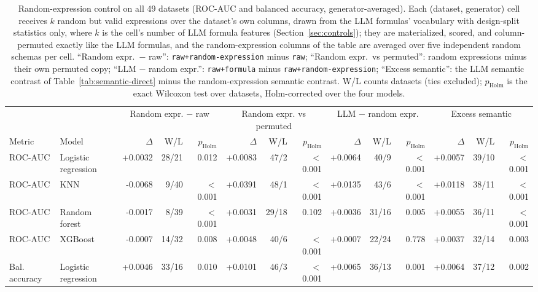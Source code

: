\begin{table}[tbp]
\caption{Random-expression control on all 49 datasets (ROC-AUC and balanced accuracy, generator-averaged). Each (dataset, generator) cell receives $k$ random but valid expressions over the dataset's own columns, drawn from the LLM formulas' vocabulary with design-split statistics only, where $k$ is the cell's number of LLM formula features (Section~\ref{sec:controls}); they are materialized, scored, and column-permuted exactly like the LLM formulas, and the random-expression columns of the table are averaged over five independent random schemas per cell. ``Random expr.\ $-$ raw'': \texttt{raw+random-expression} minus \texttt{raw}; ``Random expr.\ vs permuted'': random expressions minus their own permuted copy; ``LLM $-$ random expr.'': \texttt{raw+formula} minus \texttt{raw+random-expression}; ``Excess semantic'': the LLM semantic contrast of Table~\ref{tab:semantic-direct} minus the random-expression semantic contrast. W/L counts datasets (ties excluded); $p_{\mathrm{Holm}}$ is the exact Wilcoxon test over datasets, Holm-corrected over the four models.}\label{tab:random-expression}
\centering
\small
\begin{adjustbox}{max width=\linewidth}
\begin{tabular}{llrrrrrrrrrrrr}
\toprule
& & \multicolumn{3}{c}{Random expr. $-$ raw} & \multicolumn{3}{c}{Random expr. vs permuted} & \multicolumn{3}{c}{LLM $-$ random expr.} & \multicolumn{3}{c}{Excess semantic} \\
\cmidrule(lr){3-5}\cmidrule(lr){6-8}\cmidrule(lr){9-11}\cmidrule(lr){12-14}
Metric & Model & $\Delta$ & W/L & $p_{\mathrm{Holm}}$ & $\Delta$ & W/L & $p_{\mathrm{Holm}}$ & $\Delta$ & W/L & $p_{\mathrm{Holm}}$ & $\Delta$ & W/L & $p_{\mathrm{Holm}}$ \\
\midrule
ROC-AUC & Logistic regression & +0.0032 & 28/21 & 0.012 & +0.0083 & 47/2 & $<$0.001 & +0.0064 & 40/9 & $<$0.001 & +0.0057 & 39/10 & $<$0.001 \\
ROC-AUC & KNN & -0.0068 & 9/40 & $<$0.001 & +0.0391 & 48/1 & $<$0.001 & +0.0135 & 43/6 & $<$0.001 & +0.0118 & 38/11 & $<$0.001 \\
ROC-AUC & Random forest & -0.0017 & 8/39 & $<$0.001 & +0.0031 & 29/18 & 0.102 & +0.0036 & 31/16 & 0.005 & +0.0055 & 36/11 & $<$0.001 \\
ROC-AUC & XGBoost & -0.0007 & 14/32 & 0.008 & +0.0048 & 40/6 & $<$0.001 & +0.0007 & 22/24 & 0.778 & +0.0037 & 32/14 & 0.003 \\
\midrule
Bal. accuracy & Logistic regression & +0.0046 & 33/16 & 0.010 & +0.0101 & 46/3 & $<$0.001 & +0.0065 & 36/13 & 0.001 & +0.0064 & 37/12 & 0.002 \\

\end{tabular}
\end{adjustbox}
\end{table}
